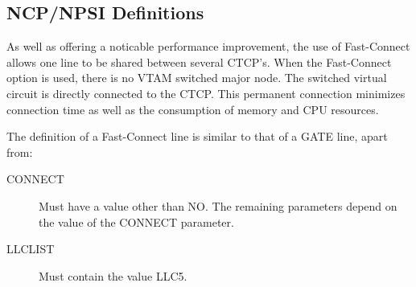 \documentclass[letterpaper,10pt,english]{sphinxmanual}
\begin{document}
\ignorespaces 

\subsection{NCP/NPSI Definitions}
\label{\detokenize{connectivity_guide:ncp-npsi-definitions}}\label{\detokenize{connectivity_guide:index-72}}
As well as offering a noticable performance improvement, the use of Fast-Connect allows one line to be shared between several CTCP’s. When the Fast-Connect option is used, there is no VTAM switched major node. The switched virtual circuit is directly connected to the CTCP. This permanent connection minimizes connection time as well as the consumption of memory and CPU resources.

The definition of a Fast-Connect line is similar to that of a GATE line, apart from:

\begin{description}
\item[{CONNECT}] \leavevmode
Must have a value other than NO. The remaining parameters depend on
the value of the CONNECT parameter.

\item[{LLCLIST}] \leavevmode
Must contain the value LLC5.

\end{description}

\ignorespaces 
\end{document}
